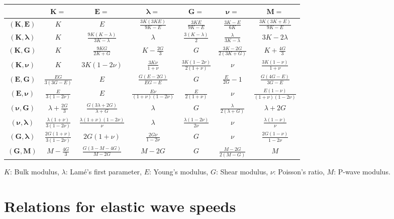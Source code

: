 \documentclass[12pt,letterpaper]{article}
\newcommand*{\bs}[1]{\boldsymbol{#1}}
\begin{document}
\begin{table}[h]
\centering
\begin{tabular}{|c|c|c|c|c|c|c|}
\hline 
&$\bs{K}=$  &$\bs{E}=$  &$\bs{\lambda}=$  &$\bs{G}=$  &$\bs{\nu}=$  &$\bs{M}=$ \\
\hline 
$\bs{(K,E)}$  &$K$ &$E$ &$\frac{3K(3KE)}{9K-E}$ &$\frac{3KE}{9K-E}$ &$\frac{3K-E}{6K}$ &$\frac{3K(3K+E)}{9K-E}$\\
\hline 
$\bs{(K,\lambda)}$ &$K$ &$\frac{9K(K-\lambda)}{3K-\lambda}$ &$\lambda$ &$\frac{3(K-\lambda)}{2}$ &$\frac{\lambda}{3K-\lambda}$ &$3K-2\lambda$\\
\hline 
$\bs{(K,G)}$ &$K$ &$\frac{9KG}{2K+G}$ &$K-\frac{2G}{3}$ &$G$ &$\frac{3K-2G}{2(3K+G)}$ &$K+\frac{4G}{3}$\\
\hline 
$\bs{(K,\nu)}$ &$K$ &$3K(1-2\nu)$ &$\frac{3K\nu}{1+\nu}$ &$\frac{3K(1-2\nu)}{2(1+\nu)}$ &$\nu$ &$\frac{3K(1-\nu)}{1+\nu}$\\
\hline 
$\bs{(E,G)}$ &$\frac{EG}{3(3G-E)}$ &$E$ &$\frac{G(E-2G)}{EG-E}$ &$G$ &$\frac{E}{2G}-1$ &$\frac{G(4G-E)}{3G-E}$\\
\hline 
$\bs{(E,\nu)}$ &$\frac{E}{3(1-2\nu)}$ &$E$ &$\frac{E\nu}{(1+\nu)(1-2\nu)}$ &$\frac{E}{2(1+\nu)}$ &$\nu$ &$\frac{E(1-\nu)}{(1+\nu)(1-2\nu)}$\\
\hline 
$\bs{(\nu,G)}$ &$\lambda+\frac{2G}{3}$ &$\frac{G(3\lambda+2G)}{\lambda+G}$ &$\lambda$ &$G$ &$\frac{\lambda}{2(\lambda+G)}$ &$\lambda+2G$\\
\hline 
$\bs{(\nu,\lambda)}$ &$\frac{\lambda(1+\nu)}{3(1-2\nu)}$ &$\frac{\lambda(1+\nu)(1-2\nu)}{\nu}$ &$\lambda$ &$\frac{\lambda(1-2\nu)}{2\nu}$ &$\nu$ &$\frac{\lambda(1-\nu)}{\nu}$\\
\hline 
$\bs{(G,\lambda)}$ &$\frac{2G(1+\nu)}{3(1-2\nu)}$ &$2G(1+\nu)$ &$\frac{2G\nu}{1-2\nu}$ &$G$ &$\nu$ &$\frac{2G(1-\nu)}{1-2\nu}$ \\ 
\hline 
$\bs{(G,M)}$ &$M-\frac{4G}{3}$& $\frac{G(3-M-4G)}{M-2G}$ &$M-2G$ &$G$ &$\frac{M-2G}{2(M-G)}$ &$M$\\
\hline 
\end{tabular}
\label{tab:elastic_constants}
\end{table}

$K$: Bulk modulus, $\lambda$: Lam\'e's first parameter, $E$: Young's
modulus, $G$: Shear modulus, $\nu$: Poisson's ratio, $M$: P-wave
modulus.


\section{Relations for elastic wave speeds}
\end{document}
